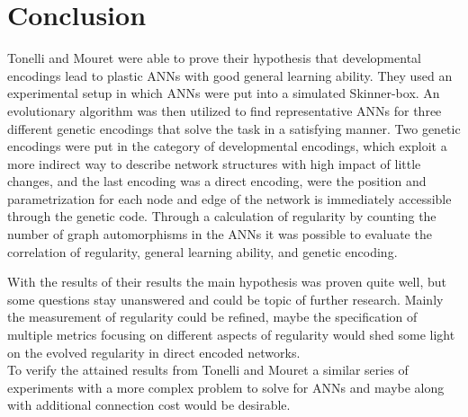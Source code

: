 \documentclass[12pt,twoside]{article}
\theoremstyle{plain}
\theoremstyle{definition}
\theoremstyle{remark}
\begin{document}
\section{Conclusion}
\label{sec:concl}
Tonelli and Mouret were able to prove their hypothesis that developmental encodings lead to plastic ANNs with good general learning ability.
They used an experimental setup in which ANNs were put into a simulated Skinner-box. An evolutionary algorithm was then utilized to find representative ANNs for three different genetic encodings that solve the task in a satisfying manner.
Two genetic encodings were put in the category of developmental encodings, which exploit a more indirect way to describe network structures with high impact of little changes, and the last encoding was a direct encoding, were the position and parametrization for each node and edge of the network is immediately accessible through the genetic code.
Through a calculation of regularity by counting the number of graph automorphisms in the ANNs it was possible to evaluate the correlation of regularity, general learning ability, and genetic encoding.\medskip

With the results of their results the main hypothesis was proven quite well, but some questions stay unanswered and could be topic of further research.
Mainly the measurement of regularity could be refined, maybe the specification of multiple metrics focusing on different aspects of regularity would shed some light on the evolved regularity in direct encoded networks.\\
To verify the attained results from Tonelli and Mouret a similar series of experiments with a more complex problem to solve for ANNs and maybe along with additional connection cost would be desirable.

%
%
\newpage


\end{document}
